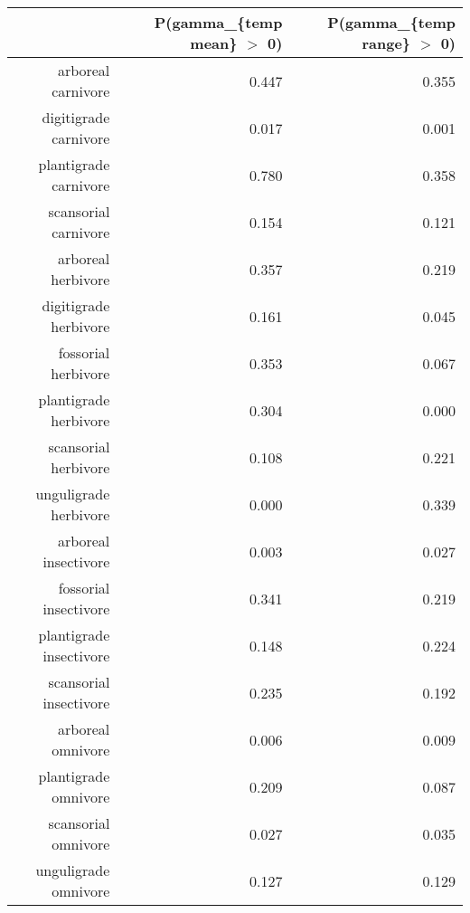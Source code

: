 \begin{table}[ht]
\centering
\begin{tabular}{rrr}
  \hline
 & P(gamma\_\{temp mean\} $>$ 0) & P(gamma\_\{temp range\} $>$ 0) \\ 
  \hline
arboreal carnivore & 0.447 & 0.355 \\ 
  digitigrade carnivore & 0.017 & 0.001 \\ 
  plantigrade carnivore & 0.780 & 0.358 \\ 
  scansorial carnivore & 0.154 & 0.121 \\ 
  arboreal herbivore & 0.357 & 0.219 \\ 
  digitigrade herbivore & 0.161 & 0.045 \\ 
  fossorial herbivore & 0.353 & 0.067 \\ 
  plantigrade herbivore & 0.304 & 0.000 \\ 
  scansorial herbivore & 0.108 & 0.221 \\ 
  unguligrade herbivore & 0.000 & 0.339 \\ 
  arboreal insectivore & 0.003 & 0.027 \\ 
  fossorial insectivore & 0.341 & 0.219 \\ 
  plantigrade insectivore & 0.148 & 0.224 \\ 
  scansorial insectivore & 0.235 & 0.192 \\ 
  arboreal omnivore & 0.006 & 0.009 \\ 
  plantigrade omnivore & 0.209 & 0.087 \\ 
  scansorial omnivore & 0.027 & 0.035 \\ 
  unguligrade omnivore & 0.127 & 0.129 \\ 
   \hline
\end{tabular}
\label{tab:origin_temp}
\end{table}
